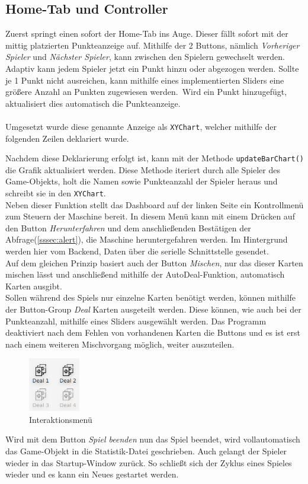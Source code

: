 \subsection{Home-Tab und Controller}
Zuerst springt einen sofort der Home-Tab ins Auge.
Dieser fällt sofort mit der mittig platzierten Punkteanzeige auf.
Mithilfe der 2 Buttons, nämlich \textit{Vorheriger Spieler} und \textit{Nächster Spieler}, kann zwischen den Spielern gewechselt werden.
Adaptiv kann jedem Spieler jetzt ein Punkt hinzu oder abgezogen werden.
Sollte je 1 Punkt nicht ausreichen, kann mithilfe eines implementierten Sliders eine größere Anzahl an Punkten zugewiesen werden.\
Wird ein Punkt hinzugefügt, aktualisiert dies automatisch die Punkteanzeige.\\\\
Umgesetzt wurde diese genannte Anzeige als \lstinline[style=java]{XYChart}, welcher mithilfe der folgenden Zeilen deklariert wurde.

Nachdem diese Deklarierung erfolgt ist, kann mit der Methode \lstinline[style=java]{updateBarChart()} die Grafik aktualisiert werden.
Diese Methode iteriert durch alle Spieler des Game-Objekts, holt die Namen sowie Punkteanzahl der Spieler heraus und schreibt sie in den \lstinline[style=java]{XYChart}.\\
Neben dieser Funktion stellt das Dashboard auf der linken Seite ein Kontrollmenü zum Steuern der Maschine bereit.
In diesem Menü kann mit einem Drücken auf den Button \textit{Herunterfahren} und dem anschließenden Bestätigen der Abfrage(\autoref{sssec:alert}), die Maschine heruntergefahren werden.
Im Hintergrund werden hier vom Backend, Daten über die serielle Schnittstelle gesendet.\\
Auf dem gleichen Prinzip basiert auch der Button \textit{Mischen}, nur das dieser Karten mischen lässt und anschließend mithilfe der AutoDeal-Funktion, automatisch Karten ausgibt.\\
Sollen während des Spiels nur einzelne Karten benötigt werden, können mithilfe der Button-Group \textit{Deal} Karten ausgeteilt werden.
Diese können, wie auch bei der Punkteanzahl, mithilfe eines Sliders ausgewählt werden.
Das Programm deaktiviert nach dem Fehlen von vorhandenen Karten die Buttons und es ist erst nach einem weiteren Mischvorgang möglich, weiter auszuteilen.\\
\begin{figure}[H]
\centering
\includegraphics[width=0.2\textwidth]{fig/ainf/Interface.png}
\caption{Interaktionsmenü}
\label{interface}
\end{figure}
Wird mit dem Button \textit{Spiel beenden} nun das Spiel beendet, wird vollautomatisch das Game-Objekt in die Statistik-Datei geschrieben.
Auch gelangt der Spieler wieder in das Startup-Window zurück.
So schließt sich der Zyklus eines Spieles wieder und es kann ein Neues gestartet werden.
